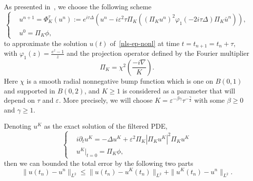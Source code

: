 \documentclass[10pt,a4paper]{article}
\begin{document}
  As presented in~\cite{ORS21}, we choose the following scheme
  \begin{equation}\label{num-sol} %
    \left\{
    \begin{aligned}
      & u^{n+1} = \Phi_K^{\tau}(u^n) := e^{i\tau\Delta} \left( u^n -
      i\varepsilon^2 \tau \Pi_K
      \left( {(\Pi_K u^n)}^2 \varphi_1(-2i\tau\Delta)\Pi_K \bar{u}^n \right) \right), \\
      & u^0 = \Pi_K \phi,
    \end{aligned}
    \right.
  \end{equation}
  to approximate the solution \(u(t)\) of~\eqref{nls-ep-nonl} at time \( t = t_{n+1} = t_n + \tau \),
  with \( \varphi_1(z) = \frac{e^z-1}{z} \) and the projection operator defined
  by the Fourier multiplier
  \begin{equation}
    \Pi_K = \chi^2 \left( \frac{-i\nabla}{K} \right).
  \end{equation}
  Here \(\chi\) is a smooth radial nonnegative bump function which is one on \(
  B(0,1) \) and supported in \( B(0,2) \), and \( K \geq 1 \) is considered as a
  parameter that will depend on \(\tau\) and \(\varepsilon\). More precisely, we will choose \( K =
  \varepsilon^{-\beta\gamma}\tau^{-\frac\gamma2} \) with some \(\beta \geq 0\) and 
  \(\gamma \geq 1\).  %

  Denoting \(u^K\) as the exact solution of the filtered PDE,
  \begin{equation}\label{nls-fil} %
    \left\{
    \begin{aligned}
      & i\partial_t u^K = -\Delta u^K + \varepsilon^2 \Pi_K|\Pi_K u^K|^2 \Pi_K u^K \\
      & u^K|_{t=0} = \Pi_K\phi,
    \end{aligned}
    \right.
  \end{equation}
  then we can bounded the total error by the following two parts
  \begin{equation}\label{seperr}
    \| u(t_n) - u^n \|_{L^2} \leq \| u(t_n) - u^K(t_n) \|_{L^2} + 
    \| u^K(t_n) - u^n \|_{L^2}.
  \end{equation}

  
\end{document}
